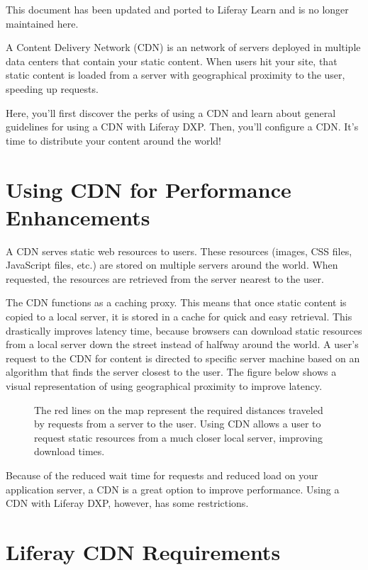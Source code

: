 {This document has been updated and ported to Liferay Learn and is no
longer maintained here.}

A Content Delivery Network (CDN) is an network of servers deployed in
multiple data centers that contain your static content. When users hit
your site, that static content is loaded from a server with geographical
proximity to the user, speeding up requests.

Here, you'll first discover the perks of using a CDN and learn about
general guidelines for using a CDN with Liferay DXP. Then, you'll
configure a CDN. It's time to distribute your content around the world!

\section{Using CDN for Performance
Enhancements}\label{using-cdn-for-performance-enhancements}

A CDN serves static web resources to users. These resources (images, CSS
files, JavaScript files, etc.) are stored on multiple servers around the
world. When requested, the resources are retrieved from the server
nearest to the user.

The CDN functions as a caching proxy. This means that once static
content is copied to a local server, it is stored in a cache for quick
and easy retrieval. This drastically improves latency time, because
browsers can download static resources from a local server down the
street instead of halfway around the world. A user's request to the CDN
for content is directed to specific server machine based on an algorithm
that finds the server closest to the user. The figure below shows a
visual representation of using geographical proximity to improve
latency.

\begin{figure}
\centering
{}
\caption{The red lines on the map represent the required distances
traveled by requests from a server to the user. Using CDN allows a user
to request static resources from a much closer local server, improving
download times.}
\end{figure}

Because of the reduced wait time for requests and reduced load on your
application server, a CDN is a great option to improve performance.
Using a CDN with Liferay DXP, however, has some restrictions.

\section{Liferay CDN Requirements}\label{liferay-cdn-requirements}

